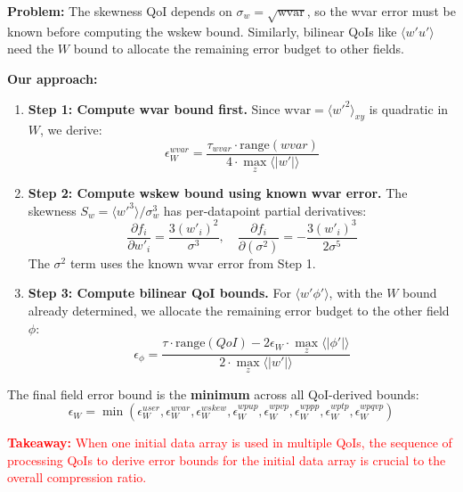 \documentclass[11pt,a4paper]{article}
\begin{document}
\textbf{Problem:} The skewness QoI depends on $\sigma_w = \sqrt{\text{wvar}}$, so the wvar error must be known before computing the wskew bound. Similarly, bilinear QoIs like $\langle w'u' \rangle$ need the $W$ bound to allocate the remaining error budget to other fields.

\textbf{Our approach:}
\begin{enumerate}
    \item \textbf{Step 1: Compute wvar bound first.} Since $\text{wvar} = \langle w'^2 \rangle_{xy}$ is quadratic in $W$, we derive:
    \begin{equation}
        \epsilon_W^{wvar} = \frac{\tau_{wvar} \cdot \text{range}(wvar)}{4 \cdot \max_z \langle |w'| \rangle}
    \end{equation}

    \item \textbf{Step 2: Compute wskew bound using known wvar error.} The skewness $S_w = \langle w'^3 \rangle / \sigma_w^3$ has per-datapoint partial derivatives:
    \begin{equation}
        \frac{\partial f_i}{\partial w'_i} = \frac{3(w'_i)^2}{\sigma^3}, \quad \frac{\partial f_i}{\partial(\sigma^2)} = -\frac{3(w'_i)^3}{2\sigma^5}
    \end{equation}
    The $\sigma^2$ term uses the known wvar error from Step 1.

    \item \textbf{Step 3: Compute bilinear QoI bounds.} For $\langle w'\phi' \rangle$, with the $W$ bound already determined, we allocate the remaining error budget to the other field $\phi$:
    \begin{equation}
        \epsilon_\phi = \frac{\tau \cdot \text{range}(QoI) - 2\epsilon_W \cdot \max_z\langle|\phi'|\rangle}{2 \cdot \max_z\langle|w'|\rangle}
    \end{equation}
\end{enumerate}

The final field error bound is the \textbf{minimum} across all QoI-derived bounds:
\begin{equation}
    \epsilon_W = \min(\epsilon_W^{user}, \epsilon_W^{wvar}, \epsilon_W^{wskew}, \epsilon_W^{wpup}, \epsilon_W^{wpvp}, \epsilon_W^{wppp}, \epsilon_W^{wptp}, \epsilon_W^{wpqvp})
\end{equation}

\textcolor{red}{\textbf{Takeaway:} When one initial data array is used in multiple QoIs, the sequence of processing QoIs to derive error bounds for the initial data array is crucial to the overall compression ratio.}
\end{document}
